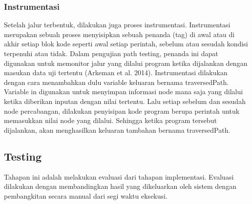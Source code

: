 \subsubsection*{Instrumentasi}
Setelah jalur terbentuk, dilakukan juga proses instrumentasi. Instrumentasi merupakan sebuah proses menyisipkan sebuah penanda (tag) di awal atau di akhir setiap blok kode seperti awal setiap perintah, sebelum atau sesudah kondisi terpenuhi atau tidak. Dalam pengujian path testing, penanda ini dapat digunakan untuk memonitor jalur yang dilalui program ketika dijalankan dengan masukan data uji tertentu (Arkeman et al. 2014). 
Instrumentasi dilakukan dengan cara menambahkan dulu variable keluaran bernama traversedPath. Variable in digunakan untuk menyimpan informasi node mana saja yang dilalui ketika diberikan inputan dengan nilai tertentu. Lalu setiap sebelum dan sesudah node percabangan, dilakukan penyisipan kode program berupa perintah untuk memasukkan nilai node yang dilalui. Sehingga ketika program tersebut dijalankan, akan menghasilkan keluaran tambahan bernama traversedPath. 

\subsection*{Testing}

Tahapan ini adalah melakukan evaluasi dari tahapan implementasi. Evaluasi dilakukan dengan membandingkan hasil yang dikeluarkan oleh sistem dengan pembangkitan secara manual dari segi waktu eksekusi. 
